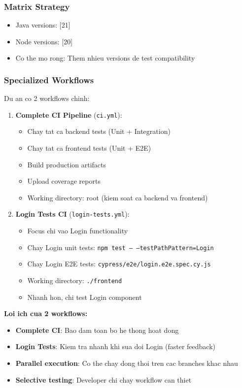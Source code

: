\subsubsection{Matrix Strategy}

\begin{itemize}
    \item Java versions: [21]
    \item Node versions: [20]
    \item Co the mo rong: Them nhieu versions de test compatibility
\end{itemize}

\subsubsection{Specialized Workflows}

Du an co 2 workflows chinh:

\begin{enumerate}
    \item \textbf{Complete CI Pipeline} (\texttt{ci.yml}):
    \begin{itemize}
        \item Chay tat ca backend tests (Unit + Integration)
        \item Chay tat ca frontend tests (Unit + E2E)
        \item Build production artifacts
        \item Upload coverage reports
        \item Working directory: root (kiem soat ca backend va frontend)
    \end{itemize}
    
    \item \textbf{Login Tests CI} (\texttt{login-tests.yml}):
    \begin{itemize}
        \item Focus chi vao Login functionality
        \item Chay Login unit tests: \texttt{npm test -- --testPathPattern=Login}
        \item Chay Login E2E tests: \texttt{cypress/e2e/login.e2e.spec.cy.js}
        \item Working directory: \texttt{./frontend}
        \item Nhanh hon, chi test Login component
    \end{itemize}
\end{enumerate}

\textbf{Loi ich cua 2 workflows:}
\begin{itemize}
    \item \textbf{Complete CI}: Bao dam toan bo he thong hoat dong
    \item \textbf{Login Tests}: Kiem tra nhanh khi sua doi Login (faster feedback)
    \item \textbf{Parallel execution}: Co the chay dong thoi tren cac branches khac nhau
    \item \textbf{Selective testing}: Developer chi chay workflow can thiet
\end{itemize}

